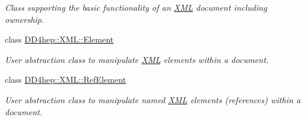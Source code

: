 \begin{DoxyCompactItemize}
\begin{DoxyCompactList}\small\item\em Class supporting the basic functionality of an \hyperlink{namespace_d_d4hep_1_1_x_m_l}{XML} document including ownership. \item\end{DoxyCompactList}\item 
class \hyperlink{class_d_d4hep_1_1_x_m_l_1_1_element}{DD4hep::XML::Element}
\begin{DoxyCompactList}\small\item\em User abstraction class to manipulate \hyperlink{namespace_d_d4hep_1_1_x_m_l}{XML} elements within a document. \item\end{DoxyCompactList}\item 
class \hyperlink{class_d_d4hep_1_1_x_m_l_1_1_ref_element}{DD4hep::XML::RefElement}
\begin{DoxyCompactList}\small\item\em User abstraction class to manipulate named \hyperlink{namespace_d_d4hep_1_1_x_m_l}{XML} elements (references) within a document. \item\end{DoxyCompactList}\end{DoxyCompactItemize}
